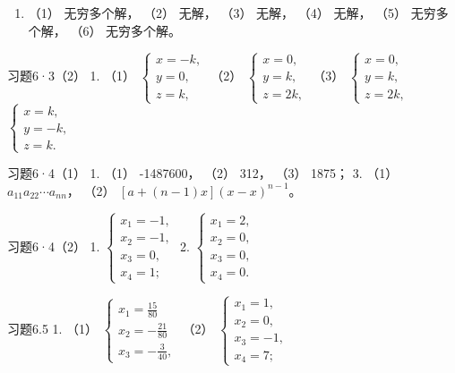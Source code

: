 \begin{enumerate}[start=2]
\item
  （1） 无穷多个解， （2） 无解， （3） 无解， （4） 无解， （5）
  无穷多个解， （6） 无穷多个解。
\end{enumerate}

习题6·3（2） 1. （1）
\(\left\{ \begin{array}{l} x = -k, \\ y = 0, \\ z = k, \end{array} \right.\)
（2）
\(\left\{ \begin{array}{l} x = 0, \\ y = k, \\ z = 2k, \end{array} \right.\)
（3）
\(\left\{ \begin{array}{l} x = 0, \\ y = k, \\ z = 2k, \end{array} \right.\)
\(\left\{ \begin{array}{l} x = k, \\ y = -k, \\ z = k. \end{array} \right.\)

习题6·4（1） 1. （1） -1487600， （2） 312， （3） 1875； 3. （1）
\(a_{11}a_{22}\cdots a_{nn}\)， （2）
\([a + (n - 1)x](x - x)^{n - 1}\)。

习题6·4（2） 1.
\(\left\{ \begin{array}{l} x_{1} = -1, \\ x_{2} = -1, \\ x_{3} = 0, \\ x_{4} = 1; \end{array} \right.\)
2.
\(\left\{ \begin{array}{l} x_{1} = 2, \\ x_{2} = 0, \\ x_{3} = 0, \\ x_{4} = 0. \end{array} \right.\)

习题6.5 1. （1）
\(\left\{ \begin{array}{l} x_{1} = \frac{15}{80} \\ x_{2} = -\frac{21}{80} \\ x_{3} = -\frac{3}{40}, \end{array} \right.\)
（2）
\(\left\{ \begin{array}{l} x_{1} = 1, \\ x_{2} = 0, \\ x_{3} = -1, \\ x_{4} = 7; \end{array} \right.\)

